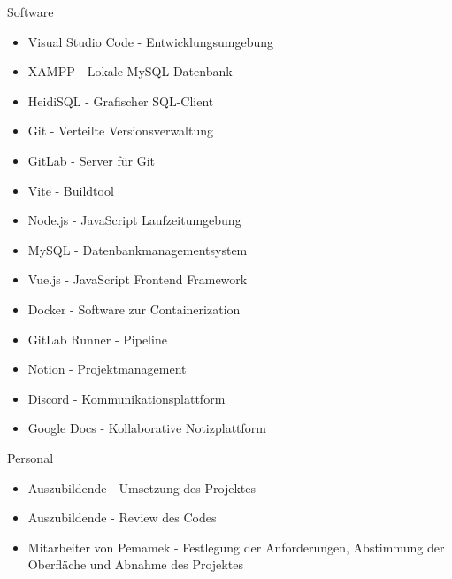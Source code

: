 \documentclass[12pt, ngerman, a4paper,toc=left, parskip=half, numbers=noenddot, headings=standardclasses, nonumberlist]{scrartcl}
\begin{document}
Software
\begin{itemize}
  \item Visual Studio Code - Entwicklungsumgebung
  \item XAMPP - Lokale MySQL Datenbank
  \item HeidiSQL - Grafischer SQL-Client
  \item Git - Verteilte Versionsverwaltung
  \item GitLab - Server für Git
  \item Vite - Buildtool
  \item Node.js - JavaScript Laufzeitumgebung
  \item MySQL - Datenbankmanagementsystem
  \item Vue.js - JavaScript Frontend Framework
  \item Docker - Software zur Containerization
  \item GitLab Runner - Pipeline
  \item Notion - Projektmanagement
  \item Discord - Kommunikationsplattform
  \item Google Docs - Kollaborative Notizplattform
\end{itemize}

Personal
\begin{itemize}
  \item Auszubildende - Umsetzung des Projektes
  \item Auszubildende - Review des Codes
  \item Mitarbeiter von Pemamek - Festlegung der Anforderungen, Abstimmung der Oberfläche und Abnahme des Projektes
\end{itemize}
\end{document}
